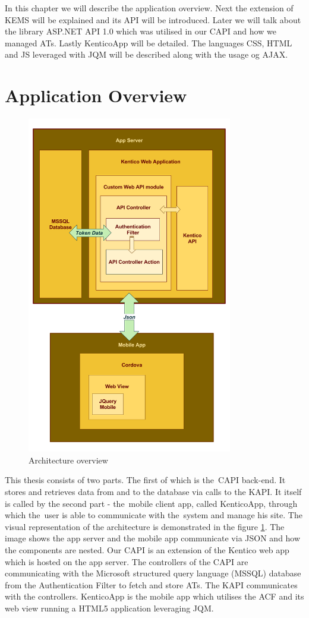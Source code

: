 In this chapter we will describe the application overview. Next the extension of KEMS will be explained and its API will be introduced. Later we will talk about the library ASP.NET API 1.0 which was utilised in our CAPI and how we managed ATs. Lastly KenticoApp will be detailed. The languages CSS, HTML and JS leveraged with JQM will be described along with the usage og AJAX.
\section{Application Overview}
\begin{figure}[ht!]
  \centering
  \includegraphics[width=0.8\textwidth]{Images/Architecture.png}
  \caption{Architecture overview}
  \label{architectureOverview}
\end{figure}
This thesis consists of two parts. The first of which is the~CAPI back-end. It stores and retrieves data from and to the database via calls to the KAPI. It itself is called by the second part - the~mobile client app, called KenticoApp, through which the~user is able to communicate with the~system and manage his site. The visual representation of the architecture is demonstrated in the figure \ref{architectureOverview}. The image shows the app server and the mobile app communicate via JSON and how the components are nested. Our CAPI is an extension of the Kentico web app which is hosted on the app server. The controllers of the CAPI are communicating with the Microsoft structured query language (MSSQL) database from the Authentication Filter to fetch and store ATs. The KAPI communicates with the controllers. KenticoApp is the mobile app which utilises the ACF and its web view running a HTML5 application leveraging JQM. 

